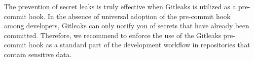 The prevention of secret leaks is truly effective when Gitleaks is utilized as a pre-commit hook.
In the absence of universal adoption of the pre-commit hook among developers, Gitleaks can only notify you of secrets that have already been committed.
Therefore, we recommend to enforce the use of the Gitleaks pre-commit hook as a standard part of the development workflow in repositories that contain sensitive data.
